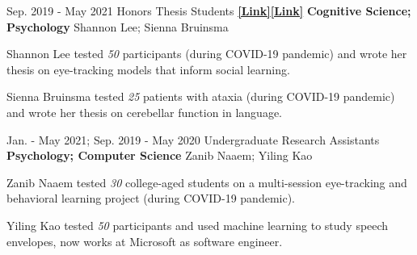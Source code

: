 
\begin{cventries}
 

  \cventry
    {Sep. 2019 - May 2021} %
    {Honors Thesis Students {\href{https://drive.google.com/file/d/1uhIOkii0y0wMr63KSzlhi7k7NqLEuFlU/view?usp=sharing}{\textbf{[Link]}}\href{https://docs.google.com/presentation/d/1GmuGhTJFQFXBuVG_8zfoTIu2ForG47HIdeSV-09GFe8/edit?usp=sharing}{\textbf{[Link]}}}} %
    {\textbf{Cognitive Science; Psychology}} %
    {Shannon Lee; Sienna Bruinsma}
    {
      \begin{cvitems} %
        \item {Shannon Lee tested \textit{50} participants (during COVID-19 pandemic) and wrote her thesis on eye-tracking models that inform social learning.}
        \item {Sienna Bruinsma tested \textit{25} patients with ataxia (during COVID-19 pandemic) and wrote her thesis on cerebellar function in language.}
      \end{cvitems}
    }
    
    
  \cventry
    {Jan. - May 2021; Sep. 2019 - May 2020} %
    {Undergraduate Research Assistants} %
    {\textbf{Psychology; Computer Science}}
   	{Zanib Naaem; Yiling Kao}
    {
      \begin{cvitems} %
        \item {Zanib Naaem tested \textit{30} college-aged students on a multi-session eye-tracking and behavioral learning project (during COVID-19 pandemic).}
        \item {Yiling Kao tested \textit{50} participants and used machine learning to study speech envelopes, now works at Microsoft as software engineer.}
      \end{cvitems}
    }
    

\end{cventries}

